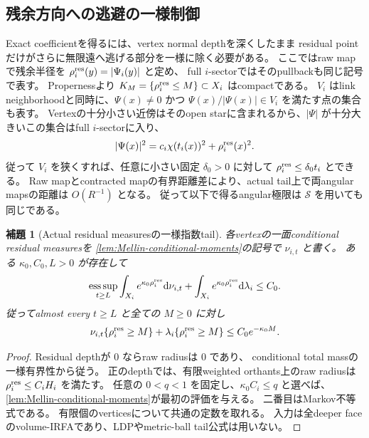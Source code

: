 \documentclass[11pt,a4paper]{ltjsarticle}
\newcommand{\dd}{\mathrm d}
\newcommand{\cS}{\mathcal S}
\theoremstyle{plain}
\newtheorem{lemma}[lemma]{補題}
\theoremstyle{definition}
\theoremstyle{remark}
\begin{document}
\subsection{残余方向への逃避の一様制御}
Exact coefficientを得るには、vertex normal depthを深くしたまま residual pointだけがさらに無限遠へ逃げる部分を一様に除く必要がある。
ここではraw mapで残余半径を $\rho_i^{\rm res}(y)=|\Psi_i(y)|$ と定め、
full $i$-sectorではそのpullbackも同じ記号で表す。
Propernessより $K_M=\{\rho_i^{\rm res}\le M\}\subset X_i$ はcompactである。
$V_i$ はlink neighborhoodと同時に、$\Psi(x)\ne0$ かつ
$\Psi(x)/|\Psi(x)|\in V_i$ を満たす点の集合も表す。
Vertexの十分小さい近傍はそのopen starに含まれるから、$|\Psi|$ が十分大きいこの集合はfull $i$-sectorに入り、
\[
 |\Psi(x)|^2=c_i\chi(t_i(x))^2+\rho_i^{\rm res}(x)^2.
\]
従って $V_i$ を狭くすれば、任意に小さい固定 $\delta_0>0$ に対して
$\rho_i^{\rm res}\le\delta_0 t_i$ とできる。
Raw mapとcontracted mapの有界距離差により、actual tail上で両angular mapsの距離は $O(R^{-1})$ となる。
従って以下で得るangular極限は $\cS$ を用いても同じである。

\begin{lemma}[Actual residual measuresの一様指数tail]
\label{lem:residual-exp}
各vertexの一面conditional residual measuresを
\cref{lem:Mellin-conditional-moments}の記号で $\nu_{i,t}$ と書く。
ある $\kappa_0,C_0,L>0$ が存在して
\[
 \operatorname*{ess\,sup}_{t\ge L}
 \int_{X_i}e^{\kappa_0\rho_i^{\rm res}}\dd\nu_{i,t}
 +\int_{X_i}e^{\kappa_0\rho_i^{\rm res}}\dd\lambda_i
 \le C_0.
\]
従ってalmost every $t\ge L$ と全ての $M\ge0$ に対し
\[
 \nu_{i,t}\{\rho_i^{\rm res}\ge M\}
 +\lambda_i\{\rho_i^{\rm res}\ge M\}
 \le C_0e^{-\kappa_0M}.
\]
\end{lemma}
\begin{proof}
Residual depthが $0$ ならraw radiusは $0$ であり、
conditional total massの一様有界性から従う。
正のdepthでは、有限weighted orthants上のraw radiusは
$\rho_i^{\rm res}\le C_iH_i$ を満たす。
任意の $0<q<1$ を固定し、$\kappa_0C_i\le q$ と選べば、
\cref{lem:Mellin-conditional-moments}が最初の評価を与える。
二番目はMarkov不等式である。
有限個のverticesについて共通の定数を取れる。
入力は全deeper faceのvolume-IRFAであり、LDPやmetric-ball tail公式は用いない。
\end{proof}
\end{document}
